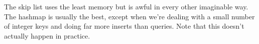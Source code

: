 \documentclass[12pt,a4paper]{article}
\begin{document}
    
    
    The skip list uses the least memory but is awful in every other imaginable way.  The hashmap is
    usually the best, except when we're dealing with a small number of integer keys and doing far more
    inserts than queries.  Note that this doesn't actually happen in practice.

    

    
\end{document}

